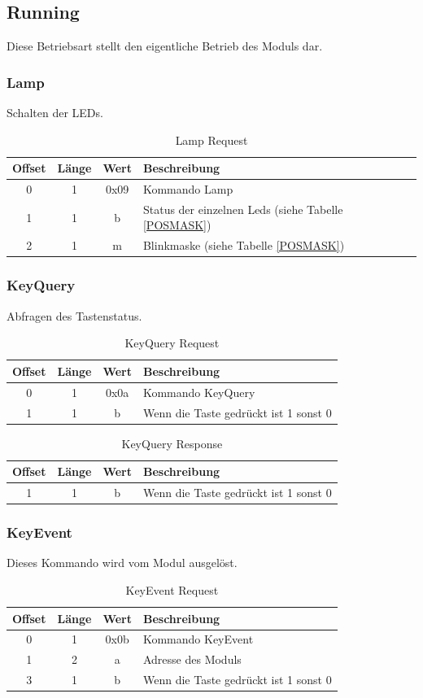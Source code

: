 \documentclass[10pt,a4paper]{article}
\begin{document}
\subsection{Running}
Diese Betriebsart stellt den eigentliche Betrieb des Moduls dar.
\subsubsection{Lamp}
\label{sec:Lamp}
Schalten der LEDs.
\begin{table}[H]
\centering
\begin{tabular}{c|c|c|l}
\textbf{Offset} & \textbf{Länge} & \textbf{Wert} & \textbf{Beschreibung} \\ \hline
0 & 1 & 0x09 & Kommando Lamp\\
1 & 1 & b & Status der einzelnen Leds (siehe Tabelle \ref{POSMASK})\\
2 & 1 & m & Blinkmaske (siehe Tabelle \ref{POSMASK})
\end{tabular}
\caption{Lamp Request}
\end{table}

\subsubsection{KeyQuery}
\label{sec:KeyQuery}
Abfragen des Tastenstatus.
\begin{table}[H]
\centering
\begin{tabular}{c|c|c|l}
\textbf{Offset} & \textbf{Länge} & \textbf{Wert} & \textbf{Beschreibung} \\ \hline
0 & 1 & 0x0a & Kommando KeyQuery\\
1 & 1 & b & Wenn die Taste gedrückt ist 1 sonst 0
\end{tabular}
\caption{KeyQuery Request}
\end{table}
\begin{table}[H]
\label{tab:keyquery_response}
\centering
\begin{tabular}{c|c|c|l}
\textbf{Offset} & \textbf{Länge} & \textbf{Wert} & \textbf{Beschreibung} \\ \hline
1 & 1 & b & Wenn die Taste gedrückt ist 1 sonst 0
\end{tabular}
\caption{KeyQuery Response}
\end{table}

\subsubsection{KeyEvent}
\label{sec:KeyEvent}
Dieses Kommando wird vom Modul ausgelöst.
\begin{table}[H]
\centering
\begin{tabular}{c|c|c|l}
\textbf{Offset} & \textbf{Länge} & \textbf{Wert} & \textbf{Beschreibung} \\ \hline
0 & 1 & 0x0b & Kommando KeyEvent\\
1 & 2 & a & Adresse des Moduls\\
3 & 1 & b & Wenn die Taste gedrückt ist 1 sonst 0
\end{tabular}
\caption{KeyEvent Request}
\end{table}
\end{document}
